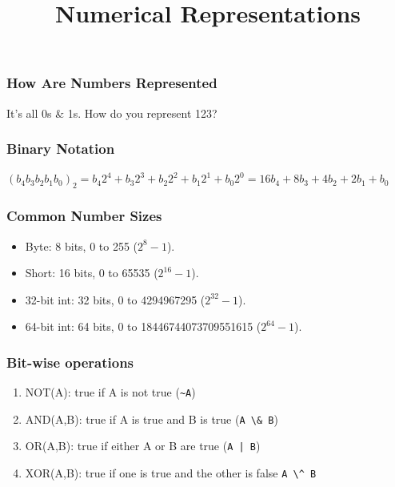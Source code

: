 
\title{Numerical Representations}

\frame{\maketitle}

\begin{frame}[fragile]
\frametitle{How Are Numbers Represented}

It's all 0s \& 1s. How do you represent 123?

\end{frame}

\begin{frame}[fragile]
\frametitle{Binary Notation}

$(b_4b_3b_2b_1b_0)_2 = b_4 2^4 + b_3 2^3 + b_2 2^2 + b_1 2^1 + b_0 2^0 = 16b_4 + 8b_3 + 4b_2 + 2 b_1 + b_0$

\end{frame}

\begin{frame}[fragile]
\frametitle{Common Number Sizes}

\begin{itemize}
\item Byte: 8 bits, 0 to 255 ($2^8-1$).
\item Short: 16 bits, 0 to 65535 ($2^{16}-1$).
\item 32-bit int: 32 bits, 0 to 4294967295 ($2^{32}-1$).
\item 64-bit int: 64 bits, 0 to 18446744073709551615 ($2^{64}-1$).
\end{itemize}
\end{frame}

\begin{frame}[fragile]
\frametitle{Bit-wise operations}

\begin{enumerate}
\item NOT(A): true if A is \alert{not} true (\lstinline{~A})
\item AND(A,B): true if A is true and B is true (\lstinline{A \& B})
\item OR(A,B): true if either A or B are true (\lstinline{A | B})
\item XOR(A,B): true if one is true and the other is false \lstinline{A \^ B}
\end{enumerate}

\end{frame}

